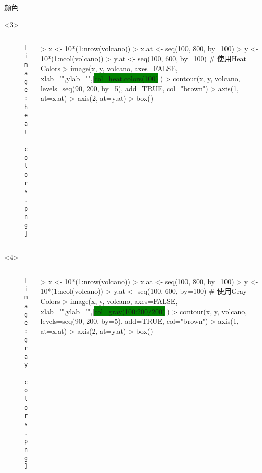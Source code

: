 \begin{frame}[t,fragile]{\subsecname}{颜色}
\begin{overlayarea}{\textwidth}{\textheight}
\begin{onlyenv}<3>
  \begin{columns}
    \begin{column}{.4\textwidth}
\centering
\begin{figure}
  \texttt{[image: heat\_colors.png]}
\end{figure}
    \end{column}

    \begin{column}{.6\textwidth}
\centering
\begin{rcode}
> x <- 10*(1:nrow(volcano))
> x.at <- seq(100, 800, by=100)
> y <- 10*(1:ncol(volcano))
> y.at <- seq(100, 600, by=100)
# 使用Heat Colors 
> image(x, y, volcano, axes=FALSE, xlab="",ylab="",|\colorbox{green}{col=heat.colors(100)}|)
> contour(x, y, volcano, levels=seq(90, 200, by=5), add=TRUE, col="brown")
> axis(1, at=x.at)
> axis(2, at=y.at)
> box()
\end{rcode}
    \end{column}
  \end{columns}
\end{onlyenv}

\begin{onlyenv}<4>
  \begin{columns}
    \begin{column}{.4\textwidth}
\centering
\begin{figure}
  \texttt{[image: gray\_colors.png]}
\end{figure}
    \end{column}

    \begin{column}{.6\textwidth}
\centering
\begin{rcode}
> x <- 10*(1:nrow(volcano))
> x.at <- seq(100, 800, by=100)
> y <- 10*(1:ncol(volcano))
> y.at <- seq(100, 600, by=100)
# 使用Gray Colors 
> image(x, y, volcano, axes=FALSE, xlab="",ylab="",|\colorbox{green}{col=gray(100:200/200)}|)
> contour(x, y, volcano, levels=seq(90, 200, by=5), add=TRUE, col="brown")
> axis(1, at=x.at)
> axis(2, at=y.at)
> box()
\end{rcode}
    \end{column}
  \end{columns}
\end{onlyenv}

\end{overlayarea}  
\end{frame}

